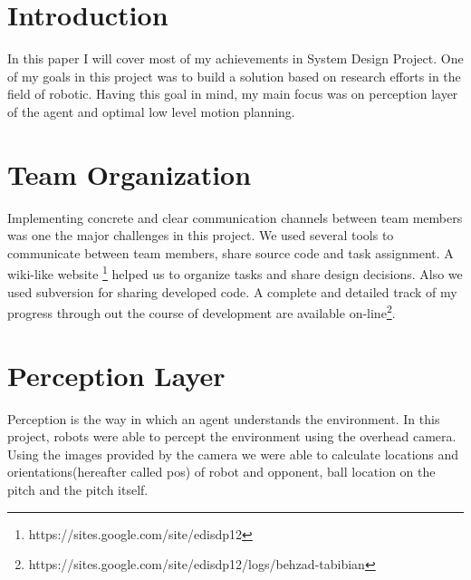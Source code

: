 \documentclass[conference,12pt]{IEEEtran}
\begin{document}




%
\IEEEpeerreviewmaketitle
	

\newcommand{\revi}[1]{ \texttt{rev.#1} }
\vspace{-3 mm}
\section{Introduction}
\vspace{-1 mm}
In this paper I will cover most of my achievements in System Design Project. One of my goals in this project was to build a solution based on research efforts in the field of robotic. Having this goal in mind, my main focus was on perception layer of the agent and optimal low level motion planning.
\vspace{-3 mm}
\section{Team Organization}
\vspace{-1 mm}
\label{TeamOrg}
Implementing concrete and clear communication channels between team members was one the major challenges in this project. We used several tools to communicate between team members, share source code and task assignment. A wiki-like website \footnote{https://sites.google.com/site/edisdp12} helped us to organize tasks and share design decisions. Also we used subversion for sharing developed code. A complete and detailed track of my progress through out the course of development are available on-line\footnote{https://sites.google.com/site/edisdp12/logs/behzad-tabibian}.
\vspace{-1 mm}
\section{Perception Layer}
Perception is the way in which an agent understands the environment. In this project, robots were able to percept the environment using the overhead camera. Using the images provided by the camera we were able to calculate locations and orientations(hereafter called pos) of robot and opponent, ball location on the pitch and the pitch itself.
\end{document}

